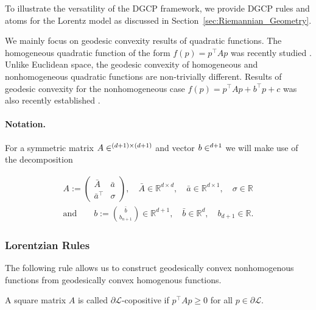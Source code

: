 \documentclass[twoside,11pt]{article}
\begin{document}
To illustrate the versatility of the DGCP framework, we provide DGCP rules and atoms for the Lorentz model as discussed in Section~\ref{sec:Riemannian_Geometry}. 

We mainly focus on geodesic convexity results of quadratic functions. The homogeneous quadratic function of the form $f(p) = p^\top A p$ was recently studied \citep{Ferreira2022}. Unlike Euclidean space, the geodesic convexity of homogeneous and nonhomogeneous quadratic functions are non-trivially different. Results of geodesic convexity for the nonhomogeneous case $f(p) = p^\top A p + b^\top p + c$ was also recently established \citep{Ferreira2023_nonhomogeneous}.

\paragraph{Notation.} For a symmetric matrix $A \in \real^{(d+1) \times (d+1)}$ and vector $b \in \real^{d+1}$ we will make use of the decomposition 

\[
\begin{gathered}
     A:=\left(\begin{array}{cc}
\bar{A} & \bar{a} \\
\bar{a}^{\top} & \sigma
\end{array}\right), \quad \bar{A} \in \mathbb{R}^{d \times d}, \quad \bar{a} \in \mathbb{R}^{d \times 1}, \quad \sigma \in \mathbb{R} \\
\text{and} \qquad b:=\binom{\bar{b}}{b_{n+1}} \in \mathbb{R}^{d+1}, \quad \bar{b} \in \mathbb{R}^d, \quad b_{d+1} \in \mathbb{R}.
\end{gathered}
\]



\subsubsection{Lorentzian Rules}

The following rule allows us to construct geodesically convex nonhomogenous functions from geodesically convex homogenous functions. 

A square matrix $A$ is called $\partial \mathcal{L}$-copositive if $p^\top A p \geq 0$ for all $p \in \partial \mathcal{L}.$
\end{document}
